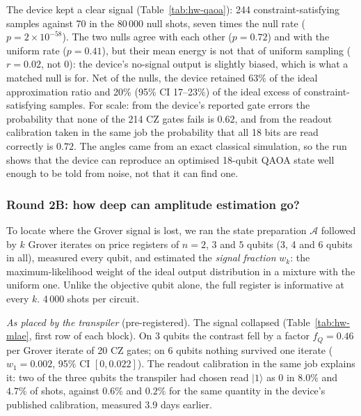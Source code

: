 \documentclass[11pt,a4paper]{article}
\begin{document}
The device kept a clear signal (Table~\ref{tab:hw-qaoa}): 244
constraint-satisfying samples against 70 in the 80\,000 null shots, seven
times the null rate ($p = 2\times10^{-58}$). The two nulls agree with each
other ($p = 0.72$) and with the uniform rate ($p = 0.41$), but their mean
energy is not that of uniform sampling ($r = 0.02$, not $0$): the device's
no-signal output is slightly biased, which is what a matched null is for.
Net of the nulls, the device retained 63\% of the ideal approximation ratio
and 20\% (95\% CI 17--23\%) of the ideal excess of constraint-satisfying
samples. For scale: from the device's reported gate errors the probability
that none of the 214 CZ gates fails is $0.62$, and from the readout
calibration taken in the same job the probability that all 18 bits are read
correctly is $0.72$. The angles came from an exact classical simulation, so
the run shows that the device can reproduce an optimised 18-qubit QAOA state
well enough to be told from noise, not that it can find one.

\subsubsection{Round 2B: how deep can amplitude estimation go?}

To locate where the Grover signal is lost, we ran the state preparation
$\mathcal A$ followed by $k$ Grover iterates on price registers of $n = 2$,
$3$ and $5$ qubits (3, 4 and 6 qubits in all), measured every qubit, and
estimated the \emph{signal fraction} $w_k$: the maximum-likelihood weight of
the ideal output distribution in a mixture with the uniform one. Unlike the
objective qubit alone, the full register is informative at every $k$. 4\,000
shots per circuit.

\emph{As placed by the transpiler} (pre-registered). The signal collapsed
(Table~\ref{tab:hw-mlae}, first row of each block). On 3 qubits the contrast
fell by a factor $f_Q = 0.46$ per Grover iterate of 20 CZ gates; on 6 qubits
nothing survived one iterate ($w_1 = 0.002$, 95\% CI $[0, 0.022]$). The
readout calibration in the same job explains it: two of the three qubits the
transpiler had chosen read $|1\rangle$ as 0 in $8.0\%$ and $4.7\%$ of shots,
against $0.6\%$ and $0.2\%$ for the same quantity in the device's published
calibration, measured 3.9 days earlier.
\end{document}
